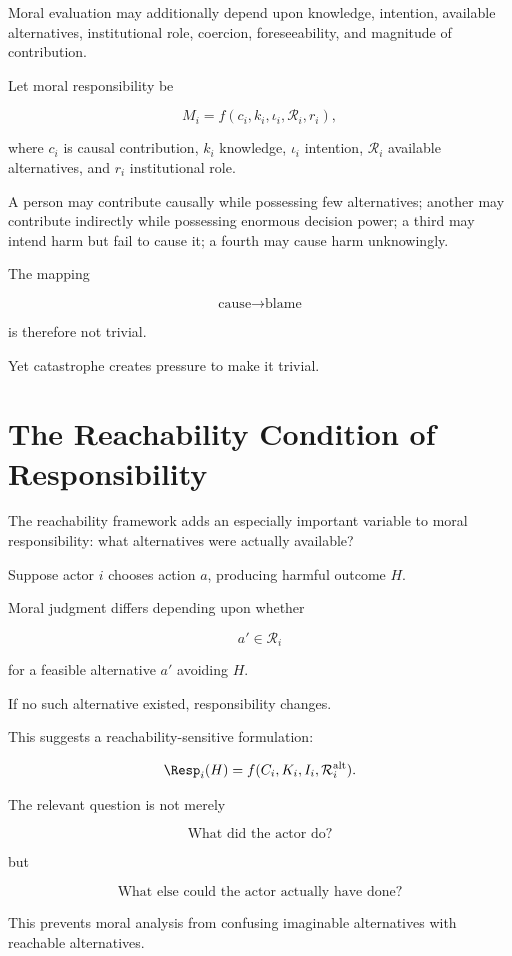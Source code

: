 \documentclass[11pt,oneside]{book}
\theoremstyle{definition}
\theoremstyle{remark}
\newcommand{\R}{\mathcal{R}}
\begin{document}
Moral evaluation may additionally depend upon knowledge, intention, available alternatives, institutional role, coercion, foreseeability, and magnitude of contribution.

Let moral responsibility be

\[
M_i
=
f(
c_i,
k_i,
\iota_i,
\R_i,
r_i
),
\]

where \(c_i\) is causal contribution, \(k_i\) knowledge, \(\iota_i\) intention, \(\R_i\) available alternatives, and \(r_i\) institutional role.

A person may contribute causally while possessing few alternatives; another may contribute indirectly while possessing enormous decision power; a third may intend harm but fail to cause it; a fourth may cause harm unknowingly.

The mapping

\[
\text{cause}\rightarrow\text{blame}
\]

is therefore not trivial.

Yet catastrophe creates pressure to make it trivial.

\section{The Reachability Condition of Responsibility}

The reachability framework adds an especially important variable to moral responsibility: what alternatives were actually available?

Suppose actor \(i\) chooses action \(a\), producing harmful outcome \(H\).

Moral judgment differs depending upon whether

\[
a'\in\R_i
\]

for a feasible alternative \(a'\) avoiding \(H\).

If no such alternative existed, responsibility changes.

This suggests a reachability-sensitive formulation:

\[
\Resp_i(H)
=
f(
C_i,
K_i,
I_i,
\R_i^{\mathrm{alt}}
).
\]

The relevant question is not merely

\[
\text{What did the actor do?}
\]

but

\[
\text{What else could the actor actually have done?}
\]

This prevents moral analysis from confusing imaginable alternatives with reachable alternatives.
\end{document}
